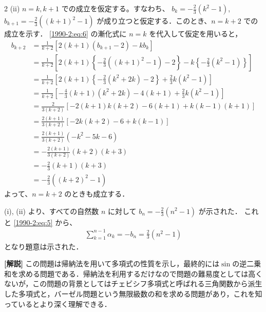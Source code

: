 \documentclass[../../main.tex]{subfiles}
\begin{document}
\begin{multicols}{2}
  \vspace{10pt}
  (ii) $n=k, k+1$ での成立を仮定する。すなわち、
  $b_k = -\frac{2}{3}(k^2 - 1)$, $b_{k+1} = -\frac{2}{3}((k+1)^2 - 1)$
  が成り立つと仮定する．このとき、$n=k+2$ での成立を示す．
  \cref{1990-2:eq:6} の漸化式に $n=k$ を代入して仮定を用いると，
  \begin{align*}
    b_{k+2}
     & = \frac{1}{k+2} \left[ 2(k+1)(b_{k+1} - 2) - k b_k \right]                                                                      \\
     & = \frac{1}{k+2} \left[ 2(k+1) \left\{ -\frac{2}{3}((k+1)^2 - 1) - 2 \right\} - k \left\{ -\frac{2}{3}(k^2 - 1) \right\} \right] \\
     & = \frac{1}{k+2} \left[ 2(k+1) \left\{ -\frac{2}{3}(k^2+2k) - 2 \right\} + \frac{2}{3}k(k^2 - 1) \right]                         \\
     & = \frac{1}{k+2} \left[ -\frac{4}{3}(k+1)(k^2+2k) - 4(k+1) + \frac{2}{3}k(k^2-1) \right]                                         \\
     & = \frac{2}{3(k+2)} \left[ -2(k+1)k(k+2) - 6(k+1) + k(k-1)(k+1) \right]                                                          \\
     & = \frac{2(k+1)}{3(k+2)} \left[ -2k(k+2) - 6 + k(k-1) \right]                                                                    \\
     & = \frac{2(k+1)}{3(k+2)} (-k^2 - 5k - 6)                                                                                         \\
     & = -\frac{2(k+1)}{3(k+2)} (k+2)(k+3)                                                                                             \\
     & = -\frac{2}{3}(k+1)(k+3)                                                                                                        \\
     & = -\frac{2}{3}((k+2)^2 - 1)
  \end{align*}
  よって、$n=k+2$ のときも成立する．

  \vspace{10pt}

  (i), (ii) より、すべての自然数 $n$ に対して $b_n = -\frac{2}{3}(n^2 - 1)$ が示された．
  これと \cref{1990-2:eq:5} から、
  \begin{align*}
    \sum_{k=1}^{n-1} \alpha_k = -b_n = \frac{2}{3}(n^2-1)
  \end{align*}
  となり題意は示された．

  \vspace{10pt}
  {\bf[解説]}
  この問題は帰納法を用いて多項式の性質を示し，最終的には$\sin$の逆二乗和を求める問題である．帰納法を利用するだけなので問題の難易度としては高くないが，この問題の背景としてはチェビシフ多項式と呼ばれる三角関数から派生した多項式と，バーゼル問題という無限級数の和を求める問題があり，これを知っているとより深く理解できる．


\end{multicols}
\end{document}
